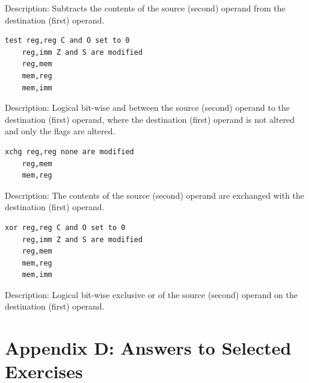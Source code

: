 \documentclass[10pt]{article}
\begin{document}
Description: Subtracts the contents of the source (second) operand from the destination (first) operand.

\begin{verbatim}
test reg,reg C and O set to 0
    reg,imm Z and S are modified
    reg,mem
    mem,reg
    mem,imm
\end{verbatim}

Description: Logical bit-wise and between the source (second) operand to the destination (first) operand, where the destination (first) operand is not altered and only the flags are altered.

\begin{verbatim}
xchg reg,reg none are modified
    reg,mem
    mem,reg
\end{verbatim}

Description: The contents of the source (second) operand are exchanged with the destination (first) operand.

\begin{verbatim}
xor reg,reg C and O set to 0
    reg,imm Z and S are modified
    reg,mem
    mem,reg
    mem,imm
\end{verbatim}

Description: Logical bit-wise exclusive or of the source (second) operand on the destination (first) operand.

\section*{Appendix D: Answers to Selected Exercises}
\end{document}
